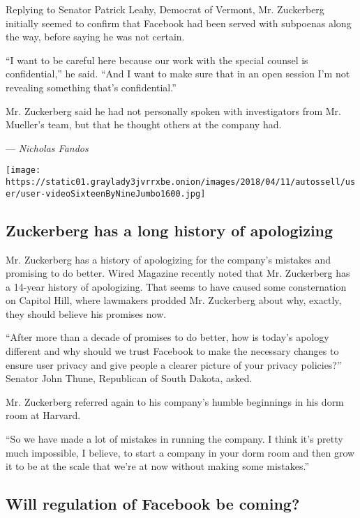 Replying to Senator Patrick Leahy, Democrat of Vermont, Mr. Zuckerberg
initially seemed to confirm that Facebook had been served with subpoenas
along the way, before saying he was not certain.

``I want to be careful here because our work with the special counsel is
confidential,'' he said. ``And I want to make sure that in an open
session I'm not revealing something that's confidential.''

Mr. Zuckerberg said he had not personally spoken with investigators from
Mr. Mueller's team, but that he thought others at the company had.

--- \emph{Nicholas Fandos}

\texttt{[image: https://static01.graylady3jvrrxbe.onion/images/2018/04/11/autossell/user/user-videoSixteenByNineJumbo1600.jpg]}

\hypertarget{zuckerberg-has-a-long-history-of-apologizing}{%
\subsection{Zuckerberg has a long history of
apologizing}\label{zuckerberg-has-a-long-history-of-apologizing}}

Mr. Zuckerberg has a history of apologizing for the company's mistakes
and promising to do better. Wired Magazine recently noted that Mr.
Zuckerberg has a 14-year history of apologizing. That seems to have
caused some consternation on Capitol Hill, where lawmakers prodded Mr.
Zuckerberg about why, exactly, they should believe his promises now.

``After more than a decade of promises to do better, how is today's
apology different and why should we trust Facebook to make the necessary
changes to ensure user privacy and give people a clearer picture of your
privacy policies?'' Senator John Thune, Republican of South Dakota,
asked.

Mr. Zuckerberg referred again to his company's humble beginnings in his
dorm room at Harvard.

``So we have made a lot of mistakes in running the company. I think it's
pretty much impossible, I believe, to start a company in your dorm room
and then grow it to be at the scale that we're at now without making
some mistakes.''

\hypertarget{will-regulation-of-facebook-be-coming}{%
\subsection{Will regulation of Facebook be
coming?}\label{will-regulation-of-facebook-be-coming}}

